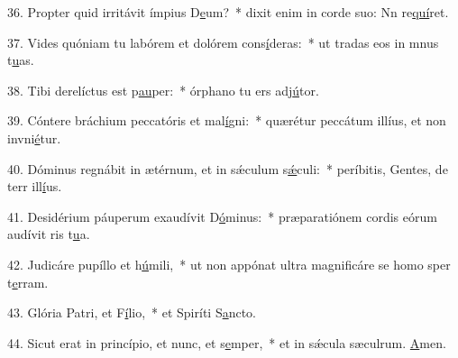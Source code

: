 36. Propter quid irritávit ímpius D\uline{e}um?~* dixit enim in corde suo: Nn re\uline{quí}ret.\par 
37. Vides quóniam tu labórem et dolórem cons\uline{í}deras:~* ut tradas eos in mnus t\uline{u}as.\par 
38. Tibi derelíctus est p\uline{au}per:~* órphano tu ers adj\uline{ú}tor.\par 
39. Cóntere bráchium peccatóris et mal\uline{í}gni:~* quærétur peccátum illíus, et non invni\uline{é}tur.\par 
40. Dóminus regnábit in ætérnum, et in sǽculum s\uline{ǽ}culi:~* períbitis, Gentes, de terr ill\uline{í}us.\par 
41. Desidérium páuperum exaudívit D\uline{ó}minus:~* præparatiónem cordis eórum audívit ris t\uline{u}a.\par 
42. Judicáre pupíllo et h\uline{ú}mili,~* ut non appónat ultra magnificáre se homo sper t\uline{e}rram.\par 
43. Glória Patri, et F\uline{í}lio,~* et Spiríti S\uline{a}ncto.\par 
44. Sicut erat in princípio, et nunc, et s\uline{e}mper,~* et in sǽcula sæculrum. \uline{A}men.\par 
